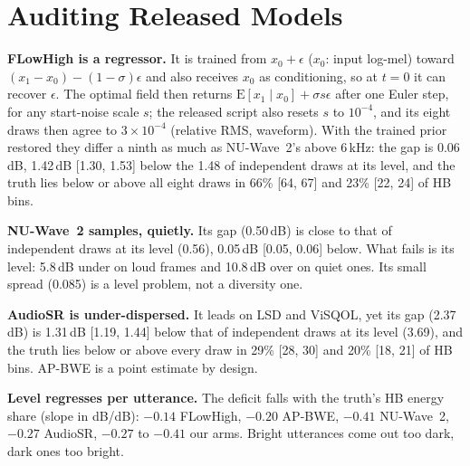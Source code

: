 \documentclass[letterpaper]{article} %
\begin{document}
\section{Auditing Released Models}
\textbf{FLowHigh is a regressor.} It is trained from $x_0+\epsilon$ ($x_0$: input log-mel) toward
$(x_1-x_0)-(1-\sigma)\epsilon$ and also receives $x_0$ as conditioning, so at $t=0$ it can recover
$\epsilon$. The optimal field then returns $\mathrm{E}[x_1\mid x_0]+\sigma s\epsilon$ after one Euler step,
for any start-noise scale $s$; the released script also resets $s$ to $10^{-4}$, and its eight draws then
agree to $3\times10^{-4}$ (relative RMS, waveform). With the trained prior restored they differ a ninth as
much as NU-Wave~2's above 6\,kHz: the gap is 0.06\,dB, 1.42\,dB [1.30, 1.53] below the 1.48 of independent
draws at its level, and the truth lies below or above all eight draws in 66\% [64, 67] and 23\% [22, 24] of
HB bins.

\textbf{NU-Wave~2 samples, quietly.} Its gap (0.50\,dB) is close to that of independent draws at its level
(0.56), 0.05\,dB [0.05, 0.06] below. What fails is its level: 5.8\,dB under on loud frames and 10.8\,dB over
on quiet ones. Its small spread (0.085) is a level problem, not a diversity one.

\textbf{AudioSR is under-dispersed.} It leads on LSD and ViSQOL, yet its gap (2.37\,dB) is 1.31\,dB
[1.19, 1.44] below that of independent draws at its level (3.69), and the truth lies below or above every
draw in 29\% [28, 30] and 20\% [18, 21] of HB bins. AP-BWE is a point estimate by design.

\textbf{Level regresses per utterance.} The deficit falls with the truth's HB energy share (slope in dB/dB):
$-0.14$ FLowHigh, $-0.20$ AP-BWE, $-0.41$ NU-Wave~2, $-0.27$ AudioSR, $-0.27$ to $-0.41$ our arms. Bright
utterances come out too dark, dark ones too bright.
\end{document}
